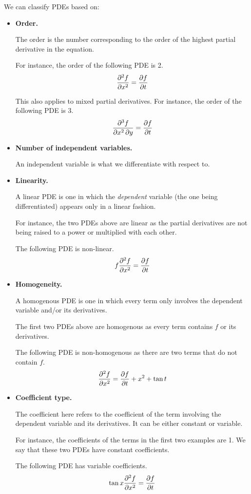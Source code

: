 We can classify PDEs based on:
\begin{itemize}
\item \textbf{Order.}

The order is the number corresponding to the order of the highest partial derivative in the equation. 

For instance, the order of the following PDE is 2. 
\[ \pdv[order={2}]{f}{x}=\pdv{f}{t} \]

This also applies to mixed partial derivatives. For instance, the order of the following PDE is 3.
\[ \pdv[order={2,1}]{f}{x,y}=\pdv{f}{t} \]

\item \textbf{Number of independent variables.}

An independent variable is what we differentiate with respect to. 

\item \textbf{Linearity.}

A linear PDE is one in which the \emph{dependent} variable (the one being differentiated) appears only in a linear fashion.

For instance, the two PDEs above are linear as the partial derivatives are not being raised to a power or multiplied with each other.

The following PDE is non-linear.
\[ f\pdv[order={2}]{f}{x}=\pdv{f}{t} \]

\item \textbf{Homogeneity.}

A homogenous PDE is one in which every term only involves the dependent variable and/or its derivatives.

The first two PDEs above are homogenous as every term contains $f$ or its derivatives.

The following PDE is non-homogenous as there are two terms that do not contain $f$.
\[ \pdv[order={2}]{f}{x}=\pdv{f}{t}+x^2+\tan t \]

\item \textbf{Coefficient type.}

The coefficient here refers to the coefficient of the term involving the dependent variable and its derivatives. It can be either constant or variable.

For instance, the coefficients of the terms in the first two examples are 1. We say that these two PDEs have constant coefficients.

The following PDE has variable coefficients.
\[ \tan x\pdv[order={2}]{f}{x}=\pdv{f}{t} \]


\end{itemize}
